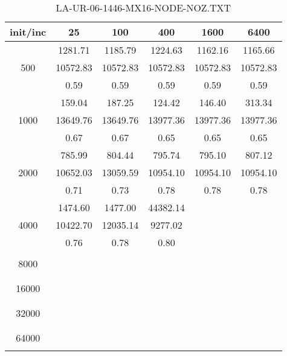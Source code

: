 \begin{table}[th]
\caption{LA-UR-06-1446-MX16-NODE-NOZ.TXT}
\label{tab:LA-UR-06-1446-MX16-NODE-NOZ.TXT}
\centering
\begin{tabular}{|c||c|c|c|c|c|}
\hline
init/inc & 25 & 100 & 400 & 1600 & 6400 \\ \hline \hline
  & 1281.71 & 1185.79 & 1224.63 & 1162.16 & 1165.66\\ 
500  & 10572.83 & 10572.83 & 10572.83 & 10572.83 & 10572.83\\ 
  & 0.59 & 0.59 & 0.59 & 0.59 & 0.59\\ \hline 
  & 159.04 & 187.25 & 124.42 & 146.40 & 313.34\\ 
1000  & 13649.76 & 13649.76 & 13977.36 & 13977.36 & 13977.36\\ 
  & 0.67 & 0.67 & 0.65 & 0.65 & 0.65\\ \hline 
  & 785.99 & 804.44 & 795.74 & 795.10 & 807.12\\ 
2000  & 10652.03 & 13059.59 & 10954.10 & 10954.10 & 10954.10\\ 
  & 0.71 & 0.73 & 0.78 & 0.78 & 0.78\\ \hline 
  & 1474.60 & 1477.00 & 44382.14 &  & \\ 
4000  & 10422.70 & 12035.14 & 9277.02 &  & \\ 
  & 0.76 & 0.78 & 0.80 &  & \\ \hline 
  &  &  &  &  & \\ 
8000  &  &  &  &  & \\ 
  &  &  &  &  & \\ \hline 
  &  &  &  &  & \\ 
16000  &  &  &  &  & \\ 
  &  &  &  &  & \\ \hline 
  &  &  &  &  & \\ 
32000  &  &  &  &  & \\ 
  &  &  &  &  & \\ \hline 
  &  &  &  &  & \\ 
64000  &  &  &  &  & \\ 
  &  &  &  &  & \\ \hline 
\end{tabular}
\end{table}

